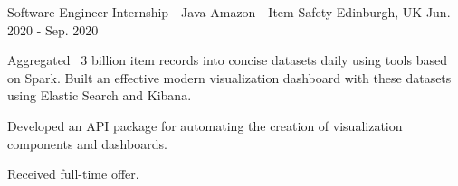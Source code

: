 \begin{cventries}
  \cventry
    {Software Engineer Internship - Java} %
    {Amazon - Item Safety} %
    {Edinburgh, UK} %
    {Jun. 2020 - Sep. 2020} %
    {
      \begin{cvitems} %
        \item {Aggregated ~3 billion item records into concise datasets daily using tools based on Spark. Built an effective modern visualization dashboard with these datasets using Elastic Search and Kibana.}
        \item {Developed an API package for automating the creation of visualization components and dashboards.}
        \item {Received full-time offer.}
      \end{cvitems}
    }


\end{cventries}
